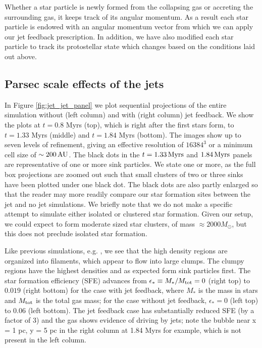 \documentclass[../dissertation.tex]{subfiles}
\begin{document}
Whether a star particle is newly formed from the collapsing gas or accreting the surrounding gas, it keeps track of its angular momentum.
As a result each star particle is endowed with an angular momentum vector from which we can apply our jet feedback prescription.
In addition, we have also modified each star particle to track its protostellar state which changes based on the conditions laid out above.


\subsection{Parsec scale effects of the jets}\label{sec:jet_large scale}

In Figure \ref{fig:jet_jet_panel} we plot sequential projections of the entire simulation without (left column) and with (right column) jet feedback.
We show the plots at $t=0.8$ Myrs (top), which is right after the first stars form, to $t=1.33$ Myrs (middle) and $t=1.84$ Myrs (bottom). The images show up to seven levels of refinement, giving an effective resolution of $16384^3$ or a minimum cell size of $\sim 200 {\rm \, AU}$.
The black dots in the $t =  1.33 \, {\rm Myrs}$ and $ 1.84 \, {\rm Myrs}$ panels are representative of one or more sink particles. 
We state one or more, as the full box projections are zoomed out such that small clusters of two or three sinks have been plotted under one black dot. 
The black dots are also partly enlarged so that the reader may more readily compare our star formation sites between the jet and no jet simulations.
We briefly note that we do not make a specific attempt to simulate either isolated or clustered star formation.
Given our setup, we could expect to form moderate sized star clusters, of mass $\approx 2000 M_\odot$, but this does not preclude isolated star formation.

Like previous simulations, e.g. \citet{1998ApJ...504..300P,2015ApJ...800...49L}, we see that the high density regions are organized into filaments, which appear to flow into large clumps.
The clumpy regions have the highest densities and as expected form sink particles first.  The star formation efficiency (SFE) advances from $\epsilon_* \equiv M_*/M_{\rm tot} = 0$ (right top) to $0.019$ (right bottom) for the case with jet feedback, where $M_*$ is the mass in stars and $M_{\rm tot}$ is the total gas mass; for the case without jet feedback, $\epsilon_* = 0$ (left top) to $0.06$ (left bottom).
The jet feedback case has substantially reduced SFE (by a factor of 3) and the gas shows evidence of driving by jets; note the bubble near x = 1 pc, y = 5 pc in the right column at 1.84 Myrs for example, which is not present in the left column.
\end{document}
